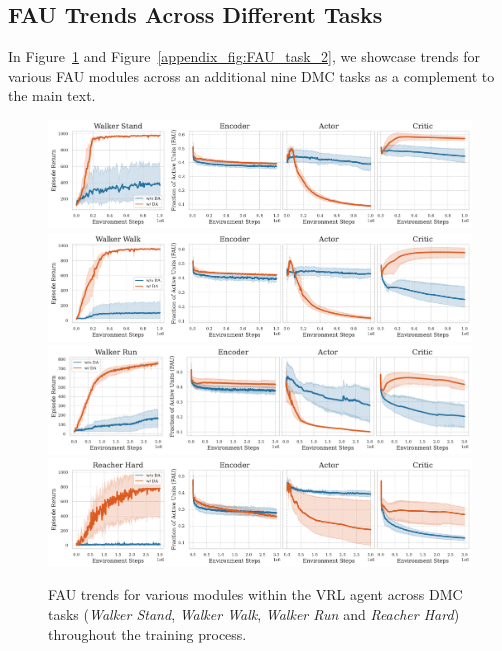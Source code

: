 \subsection{FAU Trends Across Different Tasks}
\label{Appendix: FAU trends}
In Figure~\ref{appendix_fig:FAU_task_1} and Figure~\ref{appendix_fig:FAU_task_2}, we showcase trends for various FAU modules across an additional nine DMC tasks as a complement to the main text. 
\begin{figure}[ht]
  \centering
  \vspace{2\baselineskip}
  \includegraphics[width=\textwidth]{Figures/5Appendix/FAU_walker_stand.pdf}
  \includegraphics[width=\textwidth]{Figures/5Appendix/FAU_walker_walk.pdf}
  \includegraphics[width=\textwidth]{Figures/2Modules/FAU_walker_run.pdf}
  \includegraphics[width=\textwidth]{Figures/5Appendix/FAU_reacher_hard.pdf}
  \caption{FAU trends for various modules within the VRL agent across DMC tasks (\textit{Walker Stand}, \textit{Walker Walk}, \textit{Walker Run} and \textit{Reacher Hard}) throughout the training process.}
  \label{appendix_fig:FAU_task_1}
\end{figure}

